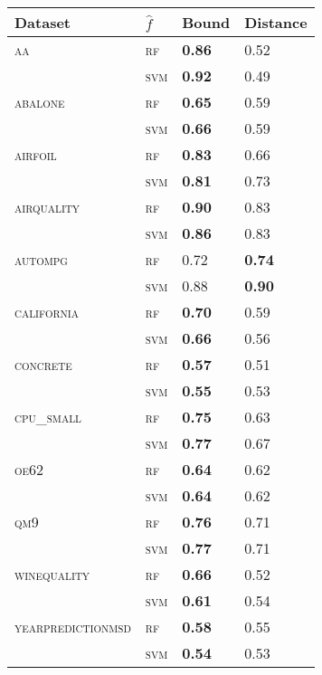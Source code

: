 \begin{tabular}{llll}
  \toprule
Dataset & $\hat f$ & Bound & Distance \\ 
  \midrule
\textsc{aa} & \textsc{rf} & \textbf{0.86} & 0.52 \\ 
   & \textsc{svm} & \textbf{0.92} & 0.49 \\ 
  \textsc{abalone} & \textsc{rf} & \textbf{0.65} & 0.59 \\ 
   & \textsc{svm} & \textbf{0.66} & 0.59 \\ 
  \textsc{airfoil} & \textsc{rf} & \textbf{0.83} & 0.66 \\ 
   & \textsc{svm} & \textbf{0.81} & 0.73 \\ 
  \textsc{airquality} & \textsc{rf} & \textbf{0.90} & 0.83 \\ 
   & \textsc{svm} & \textbf{0.86} & 0.83 \\ 
  \textsc{autompg} & \textsc{rf} & 0.72 & \textbf{0.74} \\ 
   & \textsc{svm} & 0.88 & \textbf{0.90} \\ 
  \textsc{california} & \textsc{rf} & \textbf{0.70} & 0.59 \\ 
   & \textsc{svm} & \textbf{0.66} & 0.56 \\ 
  \textsc{concrete} & \textsc{rf} & \textbf{0.57} & 0.51 \\ 
   & \textsc{svm} & \textbf{0.55} & 0.53 \\ 
  \textsc{cpu\_small} & \textsc{rf} & \textbf{0.75} & 0.63 \\ 
   & \textsc{svm} & \textbf{0.77} & 0.67 \\ 
  \textsc{oe62} & \textsc{rf} & \textbf{0.64} & 0.62 \\ 
   & \textsc{svm} & \textbf{0.64} & 0.62 \\ 
  \textsc{qm9} & \textsc{rf} & \textbf{0.76} & 0.71 \\ 
   & \textsc{svm} & \textbf{0.77} & 0.71 \\ 
  \textsc{winequality} & \textsc{rf} & \textbf{0.66} & 0.52 \\ 
   & \textsc{svm} & \textbf{0.61} & 0.54 \\ 
  \textsc{yearpredictionmsd} & \textsc{rf} & \textbf{0.58} & 0.55 \\ 
   & \textsc{svm} & \textbf{0.54} & 0.53 \\ 
   \bottomrule
\end{tabular}
